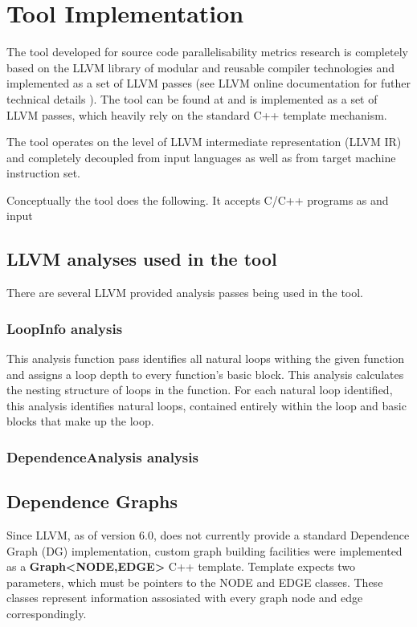 \chapter{Tool Implementation}

\qquad The tool developed for source code parallelisability metrics research is completely based on the \textsc{LLVM} library of modular and reusable compiler technologies \cite{llvm} \cite{llvm-official-website} and implemented as a set of LLVM passes (see LLVM online documentation for futher technical details \cite{llvm-online-docs}). The tool can be found at \cite{ppar-tool} and is implemented as a set of LLVM passes, which heavily rely on the standard C++ template mechanism.   

The tool operates on the level of LLVM intermediate representation \cite{llvm-online-docs-ir} (LLVM IR) and completely decoupled from input languages as well as from target machine instruction set.

\quad Conceptually the tool does the following. It accepts C/C++ programs as and input 

\section{LLVM analyses used in the tool} 
There are several LLVM provided analysis passes being used in the tool.

\subsection{LoopInfo analysis}
This analysis function pass identifies all natural loops withing the given function and assigns a loop depth to every function's basic block. This analysis calculates the nesting structure of loops in the function. For each natural loop identified, this analysis identifies natural loops, contained entirely within the loop and basic blocks that make up the loop. 

\subsection{DependenceAnalysis analysis}

\section{Dependence Graphs}
\qquad Since LLVM, as of version 6.0, does not currently provide a standard Dependence Graph (DG) implementation, custom graph building facilities were implemented as a \textbf{Graph\textless \textsc{NODE},\textsc{EDGE}\textgreater} C++ template. Template expects two parameters, which must be pointers to the NODE and EDGE classes. These classes represent information assosiated with every graph node and edge correspondingly.   

